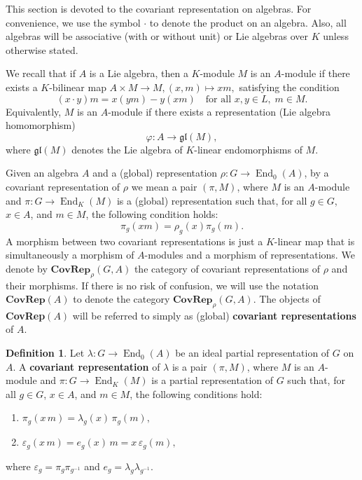 \documentclass[11pt]{amsart}
\numberwithin{equation}{section}
\theoremstyle{definition}
\newtheorem{definition}[theorem]{Definition}
\theoremstyle{remark}
\begin{document}
This section is devoted to the covariant representation on algebras. For convenience, we use the symbol $\cdot$ to denote the product on an algebra.     Also, all algebras will be associative (with or without unit) or Lie algebras over \(K\) unless otherwise stated.

 We recall that if $A$ is a Lie algebra, then a $K$-module $M$ is an $A$-module if there exists a $K$-bilinear map 
\(
A \times M \to M, (x, m) \mapsto x m,
\)
satisfying the condition 
\begin{equation} \label{eq:module_condition}
    (x \cdot y) m = x (y  m) - y (x m) \quad \text{for all } x, y \in L, \; m \in M.
\end{equation}
Equivalently, $M$ is an $A$-module if there exists a representation (Lie algebra homomorphism) 
\[
    \varphi: A \to \mathfrak{gl}(M),
\]
where $\mathfrak{gl}(M)$ denotes the Lie algebra of $K$-linear endomorphisms of $M$.



    Given an algebra \(A\) and a (global) representation \(\rho: G \to  \operatorname{End}_0 (A)\), by a covariant representation of \(\rho\) we mean a pair \((\pi, M)\), where \(M\) is an \(A\)-module and \(\pi: G \to \operatorname{End}_K(M)\) is a (global) representation such that, for all \(g \in G\), \(x \in A\), and \(m \in M\), the following condition holds:
    \[
        \pi_g(x m) = \rho_g(x) \pi_g(m).
    \]
    A morphism between two covariant representations is just a \(K\)-linear map that is simultaneously a morphism of \(A\)-modules and a morphism of representations.
    We denote by \(\textbf{CovRep}_{\rho}(G, A)\) the category of covariant representations of \(\rho\) and their morphisms.
    If there is no risk of confusion, we will use the notation \(\textbf{CovRep}(A)\) to denote the category \(\textbf{CovRep}_{\rho}(G, A)\).
    The objects of \textbf{CovRep}$(A)$ will be referred to simply as (global) \textbf{covariant representations} of \(A\).

\begin{definition}\label{d: partial covariant}
    Let $\lambda: G \to \operatorname{End}_0(A)$ be  an ideal partial representation of $G$ on \(A\).
    A \textbf{covariant representation} of $\lambda$ is a pair $(\pi, M)$, where $M$ is an $A$-module and $\pi: G \to \operatorname{End}_K(M)$ is a partial representation of $G$ such that, for all $g \in G$, $x \in A$, and $m \in M$, the following conditions hold:
    \begin{enumerate}
        \item $\pi_g(x\, m) = \lambda_g(x)\, \pi_g(m),$
        \item $\varepsilon_g(x\, m) = e_g(x)\, m = x\, \varepsilon_g(m),$
    \end{enumerate}
    where $\varepsilon_g = \pi_g \pi_{g^{-1}}$ and $e_g = \lambda_g \lambda_{g^{-1}}$.
\end{definition}
\end{document}

